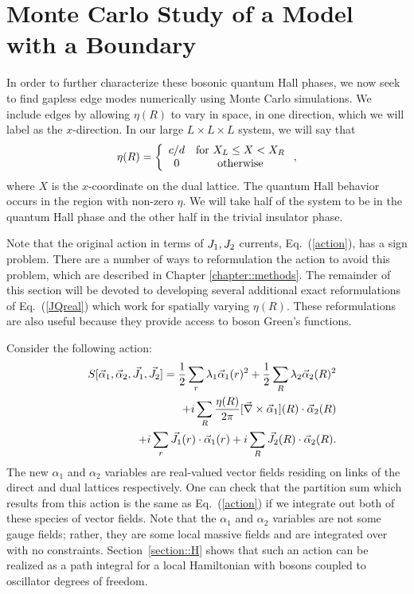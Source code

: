 \section{Monte Carlo Study of a Model with a Boundary}
\label{sec:reform}
In order to further characterize these bosonic quantum Hall phases, we now seek to find gapless edge modes numerically using Monte Carlo simulations.\cite{Senthil_Ashvin_thanks}  We include edges by allowing $\eta(R)$ to vary in space, in one direction, which we will label as the $x$-direction. In our large $L\times L\times L$ system, we will say that 
\begin{equation}
\eta(R)=\left\{\begin{array}{cc}
c/d & {\rm for}~ X_L \leq X < X_R \\
0 & {\rm otherwise}
\end{array}\right. ,
\label{etaspace}
\end{equation}
where $X$ is the $x$-coordinate on the dual lattice. The quantum Hall behavior occurs in the region with non-zero $\eta$. 
We will take half of the system to be in the quantum Hall phase and the other half in the trivial insulator phase.

Note that the original action in terms of $J_1, J_2$ currents, Eq.~(\ref{action}), has a sign problem.  There are a number of ways to reformulation the action to avoid this problem, which are described in Chapter \ref{chapter::methods}.   The remainder of this section will be devoted to developing several additional exact reformulations of Eq.~(\ref{JQreal}) which work for spatially varying $\eta(R)$.  These reformulations are also useful because they provide access to boson Green's functions.

Consider the following action:
\begin{eqnarray}
&&S[\vec{\alpha}_1,\vec{\alpha}_2,\vec{J}_1,\vec{J}_2]=\frac{1}{2}\sum_r \lambda_1 \vec{\alpha}_{1}(r)^2 + \frac{1}{2}\sum_R \lambda_2 \vec{\alpha}_{2}(R)^2  \nonumber\\
&&~~~ +i\sum_R \frac{\eta(R)}{2\pi} [\vec{\nabla}\times\vec{\alpha}_{1}](R) \cdot \vec{\alpha}_{2}(R)\nonumber\\
&&~~~ +i\sum_r \vec{J}_1(r)\cdot\vec{\alpha}_{1}(r)+i\sum_R \vec{J}_2(R)\cdot\vec{\alpha}_{2}(R).
\label{preal}
\end{eqnarray}
The new $\alpha_1$ and $\alpha_2$ variables are real-valued vector fields residing on links of the direct and dual lattices respectively. One can check that the partition sum which results from this action is the same as Eq.~(\ref{action}) if we integrate out both of these species of vector fields.  Note that the $\alpha_1$ and $\alpha_2$ variables are not some gauge fields; rather, they are some local massive fields and are integrated over with no constraints.  Section~\ref{section::H} shows that such an action can be realized as a path integral for a local Hamiltonian with bosons coupled to oscillator degrees of freedom. 

